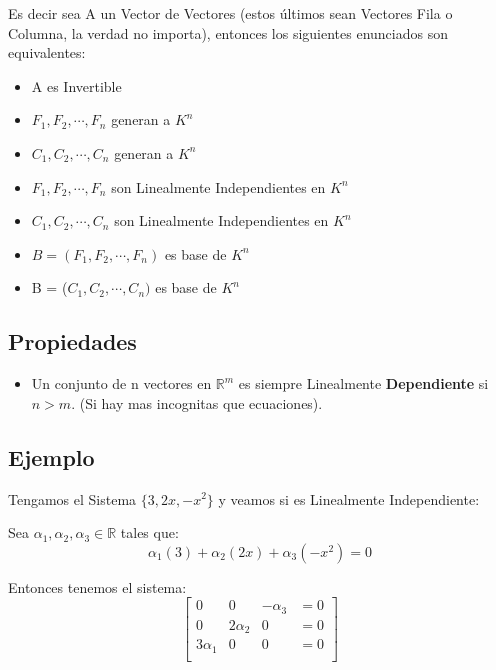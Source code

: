 \documentclass[12pt]{report}                                %
\begin{document}
        Es decir sea A un Vector de Vectores (estos últimos sean Vectores Fila
        o Columna, la verdad no importa), entonces los siguientes
        enunciados son equivalentes:

        \begin{itemize}
            \item A es Invertible
            \item $F_1, F_2, \cdots ,F_n$ generan a $K^n$
            \item $C_1, C_2, \cdots, C_n$ generan a $K^n$
            \item $F_1, F_2, \cdots, F_n$ son Linealmente Independientes en $K^n$
            \item $C_1, C_2, \cdots, C_n$ son Linealmente Independientes en $K^n$
            \item $B = (F_1, F_2, \cdots, F_n)$ es base de $K^n$
            \item B = ($C_1, C_2, \cdots, C_n)$ es base de $K^n$
        \end{itemize}
        

        \subsection{Propiedades}
        \begin{itemize}
            \item Un conjunto de n vectores en $\mathbb{R}^m$ es siempre Linealmente
             \textbf{Dependiente} si $n > m$. (Si hay mas incognitas que ecuaciones).
        \end{itemize}

        \subsection{Ejemplo}

            Tengamos el Sistema $\{3,2x,-x^2\}$ y veamos si es Linealmente Independiente:

            Sea $\alpha_1, \alpha_2, \alpha_3 \in \mathbb{R}$ tales que:
            \begin{equation*}
                \alpha_1(3) + \alpha_2(2x) + \alpha_3(-x^2) = 0
            \end{equation*}

            Entonces tenemos el sistema:
            \begin{equation*}
                \begin{bmatrix}
                    0 & 0 & -\alpha_3 & = 0\\
                    0 & 2\alpha_2 & 0 & = 0\\
                    3\alpha_1 & 0 & 0 & = 0\\
                \end{bmatrix}
            \end{equation*}
\end{document}
